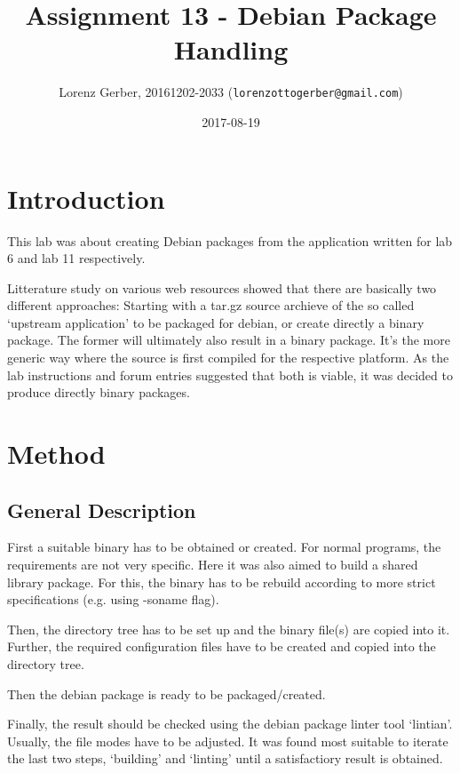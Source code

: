 \documentclass[a4paper,11pt,twoside]{article}
\title{Assignment 13 - Debian Package Handling}
\author{Lorenz Gerber, 20161202-2033 ({\tt{lorenzottogerber@gmail.com}})}
\date{2017-08-19}
\begin{document}
\lstset{language=C}
\maketitle
\thispagestyle{empty}
\newpage

\clearpage
{}

\section{Introduction}
This lab was about creating Debian packages from the application written for
lab 6 and lab 11 respectively.

Litterature study on various web resources showed that there are basically two
different approaches: Starting with a tar.gz source archieve of the so called
`upstream application' to be packaged for debian, or create directly a binary
package. The former will ultimately also result in a binary package. It's the
more generic way where the source is first compiled for the respective platform.
As the lab instructions and forum entries suggested that both is viable, it was
decided to produce directly binary packages.

\section{Method}
\subsection{General Description}
First a suitable binary has to be obtained or created. For normal programs, the
requirements are not very specific. Here it was also aimed to build
a shared library package. For this, the binary has to be rebuild according
to more strict specifications (e.g. using -soname flag)\cite{debShlibs}.

Then, the directory tree has to be set up and the binary file(s) are copied into
it. Further, the required configuration files have to be created and copied into
the directory tree.

Then the debian package is ready to be packaged/created.

Finally, the result should be checked using the debian package linter tool `lintian'.
Usually, the file modes have to be adjusted. It was found most suitable to iterate
the last two steps, `building' and `linting' until a satisfactiory result is obtained.
\end{document}
